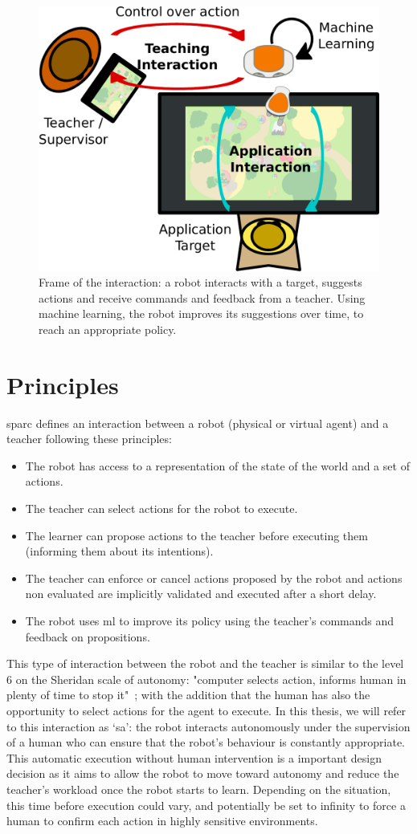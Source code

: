 \begin{figure}[ht]
	\includegraphics[width=.6\linewidth]{setup.pdf}
	\centering
	\caption{Frame of the interaction: a robot interacts with a target, suggests actions and receive commands and feedback from a teacher. Using machine learning, the robot improves its suggestions over time, to reach an appropriate policy.}
	\label{fig:frame}
\end{figure}

\section{Principles} \label{sec:sparc_principles}

\gls{sparc} defines an interaction between a robot (physical or virtual agent) and a teacher following these principles:
\begin{itemize}
	\item The robot has access to a representation of the state of the world and a set of actions.
	\item The teacher can select actions for the robot to execute.
	\item The learner can propose actions to the teacher before executing them (informing them about its intentions).
	\item The teacher can enforce or cancel actions proposed by the robot and actions non evaluated are implicitly validated and executed after a short delay.
	\item The robot uses \gls{ml} to improve its policy using the teacher's commands and feedback on propositions.
\end{itemize} 

This type of interaction between the robot and the teacher is similar to the level 6 on the Sheridan scale of autonomy: "computer selects action, informs human in plenty of time to stop it"~\citep{sheridan1978human}; with the addition that the human has also the opportunity to select actions for the agent to execute. In this thesis, we will refer to this interaction as `\gls{sa}': the robot interacts autonomously under the supervision of a human who can ensure that the robot's behaviour is constantly appropriate. This automatic execution without human intervention is a important design decision as it aims to allow the robot to move toward autonomy and reduce the teacher's workload once the robot starts to learn. Depending on the situation, this time before execution could vary, and potentially be set to infinity to force a human to confirm each action in highly sensitive environments.

